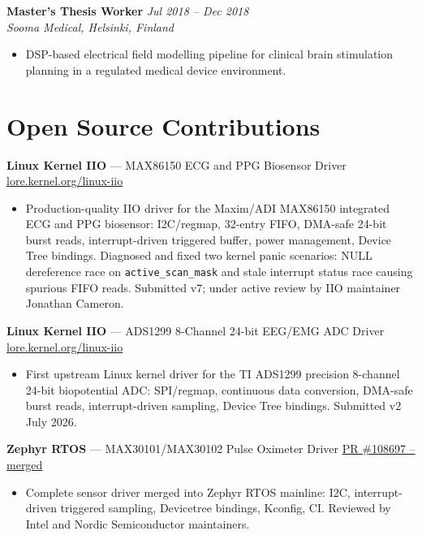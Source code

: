 \documentclass[10.5pt,a4paper]{article}
\newcommand{\job}[3]{%
  \noindent\textbf{#1} \hfill \textit{#2}\\
  \textit{\color{accent}#3}%
}
\begin{document}
\vspace{4pt}

\job{Master's Thesis Worker}{Jul 2018 -- Dec 2018}{Sooma Medical, Helsinki, Finland}
\begin{itemize}
  \item DSP-based electrical field modelling pipeline for clinical brain stimulation planning in a regulated medical device environment.
\end{itemize}

\section{Open Source Contributions}

\noindent\textbf{Linux Kernel IIO} --- MAX86150 ECG and PPG Biosensor Driver \hfill
  {\small\href{https://lore.kernel.org/linux-iio/20260707112714.2261727-1-shofiqtest@gmail.com/}{lore.kernel.org/linux-iio}}
\begin{itemize}
  \item Production-quality IIO driver for the Maxim/ADI MAX86150 integrated ECG and PPG biosensor: I2C/regmap, 32-entry FIFO, DMA-safe 24-bit burst reads, interrupt-driven triggered buffer, power management, Device Tree bindings. Diagnosed and fixed two kernel panic scenarios: NULL dereference race on \texttt{active\_scan\_mask} and stale interrupt status race causing spurious FIFO reads. Submitted v7; under active review by IIO maintainer Jonathan Cameron.
\end{itemize}

\vspace{3pt}
\noindent\textbf{Linux Kernel IIO} --- ADS1299 8-Channel 24-bit EEG/EMG ADC Driver \hfill
  {\small\href{https://lore.kernel.org/linux-iio/}{lore.kernel.org/linux-iio}}
\begin{itemize}
  \item First upstream Linux kernel driver for the TI ADS1299 precision 8-channel 24-bit biopotential ADC: SPI/regmap, continuous data conversion, DMA-safe burst reads, interrupt-driven sampling, Device Tree bindings. Submitted v2 July 2026.
\end{itemize}

\vspace{3pt}
\noindent\textbf{Zephyr RTOS} --- MAX30101/MAX30102 Pulse Oximeter Driver \hfill
  {\small\href{https://github.com/zephyrproject-rtos/zephyr/pull/108697}{PR \#108697 -- merged}}
\begin{itemize}
  \item Complete sensor driver merged into Zephyr RTOS mainline: I2C, interrupt-driven triggered sampling, Devicetree bindings, Kconfig, CI. Reviewed by Intel and Nordic Semiconductor maintainers.
\end{itemize}
\end{document}
